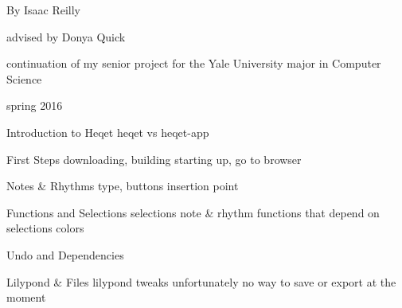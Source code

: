 \documentclass{article}
\begin{document}
\pagestyle{empty}
\begin{center}
\vspace{3cm}

\vspace{2cm}
{\Large By Isaac Reilly}

\vspace{0.15cm}
{\large advised by Donya Quick}

\vspace{0.1cm}
{continuation of my senior project for the Yale University major in Computer Science}

\vspace{13cm}

{\small spring 2016}

\end{center}

\pagebreak

\tableofcontents
\newpage
\pagestyle{plain}

\begin{section}{Introduction to Heqet}
heqet vs heqet-app
\end{section}

\begin{section}{First Steps}
downloading, building
starting up, go to browser
\end{section}

\begin{section}{Notes \& Rhythms}
type, buttons
insertion point
\end{section}

\begin{section}{Functions and Selections}
selections
note \& rhythm functions that depend on selections
colors
\end{section}


\begin{section}{Undo and Dependencies}

\end{section}


\begin{section}{Lilypond \& Files}
lilypond tweaks
unfortunately no way to save or export at the moment

\end{section}
\end{document}
